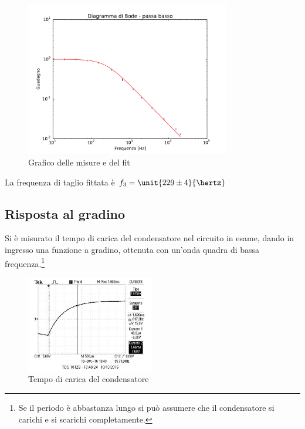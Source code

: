 \documentclass[10pt,a4paper]{article}
\begin{document}
\begin{figure}[h!]
	\centering
		
\end{figure}
\begin{figure}[h]
		\centering
		\includegraphics[width=0.8\textwidth]{../grafici/fit_Bode_Lowpass_800ohm.pdf}
		\caption{Grafico delle misure e del fit}
\end{figure}

La frequenza di taglio fittata è $f_3 = \unit{229 \pm 4}{\hertz}$

\subsection{Risposta al gradino}
Si è misurato il tempo di carica del condensatore nel circuito in esame, dando in ingresso una funzione a gradino, ottenuta con un'onda quadra di bassa frequenza.\footnote{Se il periodo è abbastanza lungo si può assumere che il condensatore si carichi e si scarichi completamente.}

\begin{figure}[h!]
	\centering
	\includegraphics[width=0.5\textwidth]{../oscilloscopio/raise_time.jpg}
	\caption{Tempo di carica del condensatore}
	\label{fig:raise}
\end{figure}
\end{document}
